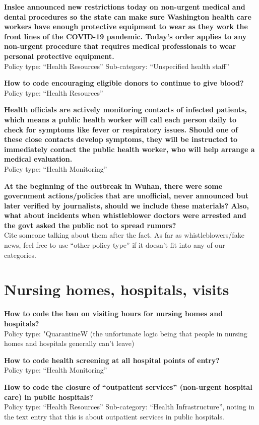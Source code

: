 \documentclass[
]{book}
\begin{document}
\textbf{Inslee announced new restrictions today on non-urgent medical and dental procedures so the state can make sure Washington health care workers have enough protective equipment to wear as they work the front lines of the COVID-19 pandemic. Today's order applies to any non-urgent procedure that requires medical professionals to wear personal protective equipment.}\\
Policy type: ``Health Resources''
Sub-category: ``Unspecified health staff''

\textbf{How to code encouraging eligible donors to continue to give blood?}\\
Policy type: ``Health Resources''

\textbf{Health officials are actively monitoring contacts of infected patients, which means a public health worker will call each person daily to check for symptoms like fever or respiratory issues. Should one of these close contacts develop symptoms, they will be instructed to immediately contact the public health worker, who will help arrange a medical evaluation.}\\
Policy type: ``Health Monitoring''

\textbf{At the beginning of the outbreak in Wuhan, there were some government actions/policies that are unofficial, never announced but later verified by journalists, should we include these materials? Also, what about incidents when whistleblower doctors were arrested and the govt asked the public not to spread rumors?}\\
Cite someone talking about them after the fact. As far as whistleblowers/fake news, feel free to use ``other policy type'' if it doesn't fit into any of our categories.

\hypertarget{nursing-homes-hospitals-visits}{%
\section{Nursing homes, hospitals, visits}\label{nursing-homes-hospitals-visits}}

\textbf{How to code the ban on visiting hours for nursing homes and hospitals?}\\
Policy type: "QuarantineW (the unfortunate logic being that people in nursing homes and hospitals generally can't leave)

\textbf{How to code health screening at all hospital points of entry?}\\
Policy type: ``Health Monitoring''

\textbf{How to code the closure of ``outpatient services'' (non-urgent hospital care) in public hospitals?}\\
Policy type: ``Health Resources''
Sub-category: ``Health Infrastructure'', noting in the text entry that this is about outpatient services in public hospitals.
\end{document}
